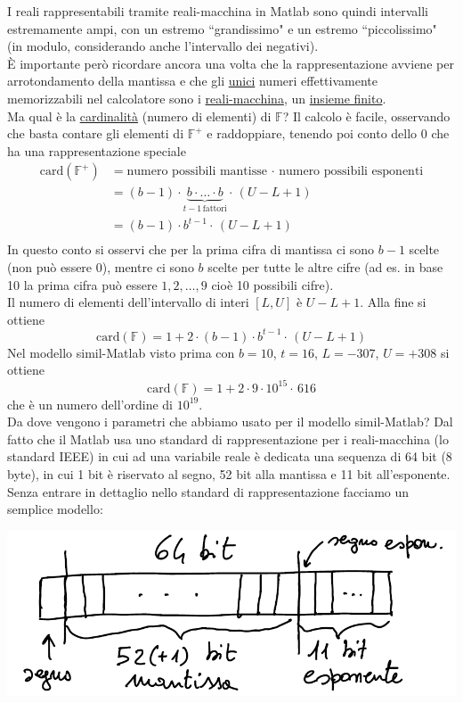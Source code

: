 \documentclass[12pt]{article}
\begin{document}
I reali rappresentabili tramite reali-macchina in Matlab sono quindi intervalli estremamente ampi, con un estremo ``grandissimo" e un estremo ``piccolissimo" (in modulo, considerando anche l'intervallo dei negativi). \\
È importante però ricordare ancora una volta che la rappresentazione avviene per arrotondamento della mantissa e che gli \uline{unici} numeri effettivamente memorizzabili nel calcolatore sono i \uline{reali-macchina}, un \uline{insieme finito}.\\
Ma qual è la \uline{cardinalità} (numero di elementi) di $\mathbb{F}$? Il calcolo è facile, osservando che basta contare gli elementi di $\mathbb{F}^+$ e raddoppiare, tenendo poi conto dello 0 che ha una rappresentazione speciale
\[\begin{split}
    \text{card}(\mathbb{F}^+) & = \text{numero possibili mantisse} \,\cdot\, \text{numero possibili esponenti} \\
    & = (b-1)\cdot \underbrace{b \cdot \dotsc \cdot b}_{t - 1 \,\text{fattori}} \cdot \, (U - L + 1) \\
    & = (b-1)\cdot b^{t - 1} \cdot \, (U - L + 1) \\
\end{split}\]
In questo conto si osservi che per la prima cifra di mantissa ci sono $b - 1$ scelte (non può essere 0), mentre ci sono $b$ scelte per tutte le altre cifre (ad es. in base 10 la prima cifra può essere $1, 2, \dotsc , 9$ cioè 10 possibili cifre). \\
Il numero di elementi dell'intervallo di interi $[L,U]$ è $U-L+1$. Alla fine si ottiene
\[ \text{card}(\mathbb{F}) = 1 + 2 \cdot (b-1)\cdot b^{t - 1} \cdot \, (U - L + 1) \]
Nel modello simil-Matlab visto prima con $b = 10$, $t = 16$, $L = -307$, $U = +308$ si ottiene \[ \text{card}(\mathbb{F}) = 1 + 2 \cdot 9\cdot 10^{15} \cdot \, 616 \]
che è un numero dell'ordine di $10^{19}$.\\
Da dove vengono i parametri che abbiamo usato per il modello simil-Matlab? Dal fatto che il Matlab usa uno standard di rappresentazione per i reali-macchina (lo standard IEEE) in cui ad una variabile reale è dedicata una sequenza di 64 bit (8 byte), in cui 1 bit è riservato al segno, 52 bit alla mantissa e 11 bit all'esponente. \\
Senza entrare in dettaglio nello standard di rappresentazione facciamo un semplice modello:
\begin{center}
    \includegraphics[scale=0.65]{img4.png}
\end{center}
\end{document}
